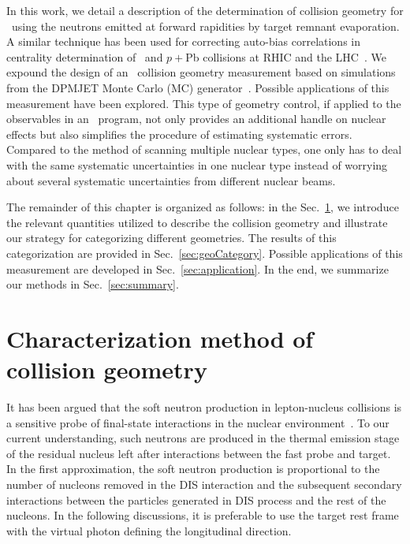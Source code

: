 In this work, we detail a description of the determination of collision
geometry for \eA\ using the neutrons emitted at forward rapidities by target
remnant evaporation. A similar technique has been used for
correcting auto-bias correlations in centrality determination of \dA\ and $p+$Pb
collisions at RHIC and the LHC~\cite{Adare:2013nff,Toia:2014wia}. We expound the
design of an \eA\ collision geometry measurement based on simulations from the DPMJET
Monte Carlo (MC) generator~\cite{Roesler:2000he}. Possible applications of this
measurement have been explored. This type of geometry control, if applied to the
observables in an \eA\ program, not only provides an additional handle on nuclear
effects but also simplifies the procedure of estimating systematic errors. Compared to the method of scanning multiple nuclear types, one
only has to deal with the same systematic uncertainties in one nuclear type
instead of worrying about several systematic uncertainties from different
nuclear beams. 


The remainder of this chapter is organized as follows: in the Sec.~\ref{sec:geoDef}, we introduce the relevant
quantities utilized to describe the collision geometry and illustrate our
strategy for categorizing different geometries. The results of this categorization
are provided in Sec.~\ref{sec:geoCategory}. Possible applications of this
measurement are developed in Sec.~\ref{sec:application}. In the end, we
summarize our methods in Sec.~\ref{sec:summary}.




\section{Characterization method of collision geometry} \label{sec:geoDef}

It has been argued that the soft neutron production in lepton-nucleus collisions is
a sensitive probe of final-state interactions in the nuclear
environment~\cite{Strikman:1998cc,White:2010tu}. To our current understanding, such neutrons
are produced in the thermal emission stage of the residual nucleus left after
interactions between the fast probe and target. In the first approximation, the
soft neutron production is proportional to the number of nucleons removed in the
DIS interaction and the subsequent secondary interactions between the
particles generated in DIS process and the rest of the nucleons. In the
following discussions, it is preferable to use the target rest frame with the virtual
photon defining the longitudinal direction.

